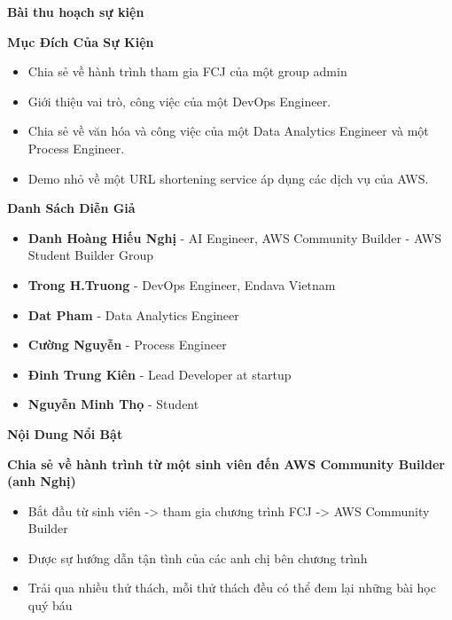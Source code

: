 \vspace{0.5em}\noindent\textbf{Bài thu hoạch sự
kiện}\par

\vspace{0.5em}\noindent\textbf{Mục Đích Của Sự
Kiện}\par

\begin{itemize}
\tightlist
\item
  Chia sẻ về hành trình tham gia FCJ của một group admin
\item
  Giới thiệu vai trò, công việc của một DevOps Engineer.
\item
  Chia sẻ về văn hóa và công việc của một Data Analytics Engineer và một
  Process Engineer.
\item
  Demo nhỏ về một URL shortening service áp dụng các dịch vụ của AWS.
\end{itemize}

\vspace{0.5em}\noindent\textbf{Danh Sách Diễn
Giả}\par

\begin{itemize}
\tightlist
\item
  \textbf{Danh Hoàng Hiếu Nghị} - AI Engineer, AWS Community Builder -
  AWS Student Builder Group
\item
  \textbf{Trong H.Truong} - DevOps Engineer, Endava Vietnam
\item
  \textbf{Dat Pham} - Data Analytics Engineer
\item
  \textbf{Cường Nguyễn} - Process Engineer
\item
  \textbf{Đinh Trung Kiên} - Lead Developer at startup
\item
  \textbf{Nguyễn Minh Thọ} - Student
\end{itemize}

\vspace{0.5em}\noindent\textbf{Nội Dung Nổi Bật}\par

\vspace{0.5em}\noindent\textbf{Chia sẻ về hành trình từ một sinh viên đến AWS Community
Builder (anh
Nghị)}\par

\begin{itemize}
\tightlist
\item
  Bắt đầu từ sinh viên -\textgreater{} tham gia chương trình FCJ
  -\textgreater{} AWS Community Builder
\item
  Được sự hướng dẫn tận tình của các anh chị bên chương trình
\item
  Trải qua nhiều thử thách, mỗi thử thách đều có thể đem lại những bài
  học quý báu
\end{itemize}

